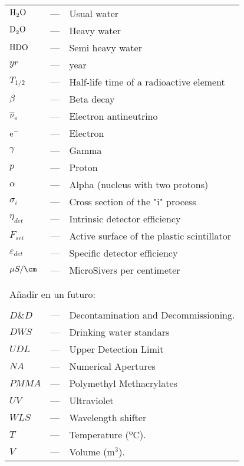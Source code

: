\begin{longtable}{p{25mm} c p{120mm} }
$\ce{H_{2}O}$ & --- & Usual water\\
$\ce{D_{2}O}$ & --- & Heavy water\\
$\ce{HDO}$ & --- & Semi heavy water\\
$yr$ & --- & year\\
$T_{1/2}$ & --- & Half-life time of a radioactive element\\
$\beta$ & --- & Beta decay\\
$\ce{\overline{\nu}_e}$ & --- & Electron antineutrino\\
$\ce{e^-}$ & --- & Electron\\
$\gamma$ & --- & Gamma\\
$p$ & --- & Proton\\
$\alpha$ & --- & Alpha (nucleus with two protons)\\
$\sigma_i$ & --- & Cross section of the "i" process\\
$\eta_{det}$ & --- & Intrinsic detector efficiency\\
$F_{sci}$ & --- & Active surface of the plastic scintillator\\
$\varepsilon_{det}$ & --- & Specific detector efficiency\\
$\mu S/\cm$ & --- & MicroSivers per centimeter\\


\\
\\
\multicolumn{3}{l}{Añadir en un futuro:}\\
\\
$D\&D$ & --- & Decontamination and Decommissioning.\\
$DWS$ & --- & Drinking water standars\\
$UDL$ & --- & Upper Detection Limit\\


$NA$ & --- & Numerical Apertures\\
$PMMA$ & --- & Polymethyl Methacrylates\\
$UV$ & --- & Ultraviolet\\
$WLS$ & --- & Wavelength shifter\\
$T$ & --- & Temperature (ºC).\\
$V$ & --- & Volume (m$^3$).\\
\end{longtable}
